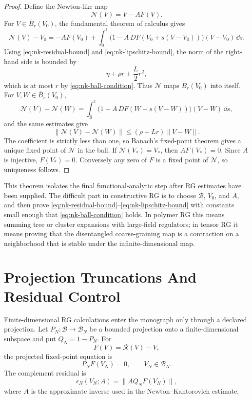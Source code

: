 \begin{proof}
Define the Newton-like map
\[
  \mathcal N(V)=V-AF(V).
\]
For \(V\in\overline B_r(V_0)\), the fundamental theorem of calculus gives
\[
  \mathcal N(V)-V_0
  =
  -AF(V_0)
  +
  \int_0^1
  \bigl(1-A\,DF(V_0+s(V-V_0))\bigr)(V-V_0)\,\dd s .
\]
Using \eqref{eq:nk-residual-bound} and
\eqref{eq:nk-lipschitz-bound}, the norm of the right-hand side is bounded by
\[
  \eta+\rho r+\frac{L}{2}r^2,
\]
which is at most \(r\) by \eqref{eq:nk-ball-condition}.  Thus
\(\mathcal N\) maps \(\overline B_r(V_0)\) into itself.  For
\(V,W\in\overline B_r(V_0)\),
\[
  \mathcal N(V)-\mathcal N(W)
  =
  \int_0^1
  \bigl(1-A\,DF(W+s(V-W))\bigr)(V-W)\,\dd s ,
\]
and the same estimates give
\[
  \|\mathcal N(V)-\mathcal N(W)\|
  \leq (\rho+Lr)\|V-W\|.
\]
The coefficient is strictly less than one, so Banach's fixed-point theorem
gives a unique fixed point of \(\mathcal N\) in the ball.  If
\(\mathcal N(V_\ast)=V_\ast\), then \(AF(V_\ast)=0\).  Since \(A\) is
injective, \(F(V_\ast)=0\).  Conversely any zero of \(F\) is a fixed point of
\(\mathcal N\), so uniqueness follows.
\end{proof}

This theorem isolates the final functional-analytic step after RG estimates
have been supplied.  The difficult part in constructive RG is to choose
\(\mathcal B\), \(V_0\), and \(A\), and then prove
\eqref{eq:nk-residual-bound}--\eqref{eq:nk-lipschitz-bound} with constants
small enough that \eqref{eq:nk-ball-condition} holds.  In polymer RG this
means summing tree or cluster expansions with large-field regulators; in
tensor RG it means proving that the disentangled coarse-graining map is a
contraction on a neighborhood that is stable under the infinite-dimensional
map.

\section{Projection Truncations And Residual Control}

Finite-dimensional RG calculations enter the monograph only through a
declared projection.  Let \(P_N:\mathcal B\to\mathcal B_N\) be a bounded
projection onto a finite-dimensional subspace and put \(Q_N=1-P_N\).  For
\[
  F(V)=\mathcal R(V)-V ,
\]
the projected fixed-point equation is
\begin{equation}
  P_NF(V_N)=0,\qquad V_N\in\mathcal B_N .
  \label{eq:projected-rg-fixed-point-equation}
\end{equation}
The complement residual is
\begin{equation}
  \epsilon_N(V_N;A)
  =
  \|A Q_NF(V_N)\|,
  \label{eq:rg-complement-residual}
\end{equation}
where \(A\) is the approximate inverse used in the
Newton--Kantorovich estimate.

